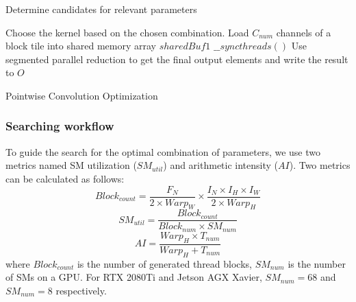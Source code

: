 \begin{algorithm}[t!]
    \small
        Determine candidates for relevant parameters\;

        Choose the kernel based on the chosen combination.\;
        Load $C_{num}$ channels of a block tile into shared memory array $sharedBuf1$\;
        $\_\_syncthreads()$\;
        Use segmented parallel reduction to get the final output elements and write the result to $O$\;
        \caption{Pointwise Convolution Optimization}
        \label{algo:pwalgo}
\end{algorithm}
\subsubsection{Searching workflow}
To guide the search for the optimal combination of parameters, we use two metrics named SM utilization ($SM_{util}$) and arithmetic intensity ($AI$).
Two metrics can be calculated as follows:
\begin{equation}\nonumber
    Block_{count}=\frac{F_N}{2 \times Warp_W} \times \frac{I_N \times I_H \times I_W}{2 \times Warp_H}
\end{equation}
\begin{equation}
    SM_{util}=\frac{Block_{count}}{Block_{num}\times SM_{num}}
    \label{fo:smutil}
\end{equation}
\begin{equation}
    AI = \frac{Warp_H \times T_{num}}{Warp_H+T_{num}}
    \label{fo:diff}
\end{equation}
where $Block_{count}$ is the number of generated thread blocks, $SM_{num}$ is the number of SMs on a GPU. For RTX 2080Ti and Jetson AGX Xavier, $SM_{num}=68$ and $SM_{num}=8$ respectively.

